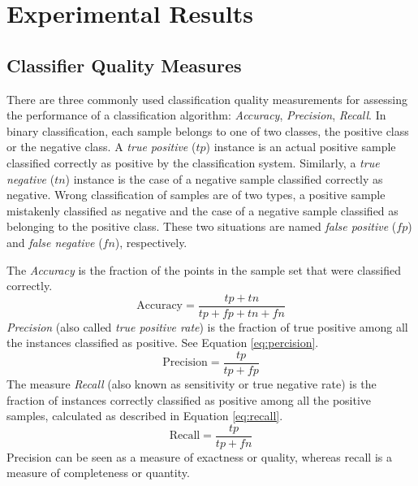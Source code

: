 \section{Experimental Results}
\label{sec:classification_results}

\subsection{Classifier Quality Measures}
\iftoggle{edit-mode}{\hspace{0pt}\marginpar{Classification types}}{}
There are three commonly used classification quality measurements for assessing the performance of a classification algorithm: \emph{Accuracy}, \emph{Precision}, \emph{Recall}.
In binary classification, each sample belongs to one of two classes, the positive class or the negative class.
A \emph{true positive} ($tp$) instance is an actual positive sample classified correctly as positive by the classification system.
Similarly, a \emph{true negative} ($tn$) instance is the case of a negative sample classified correctly as negative.  
Wrong classification of samples are of two types, a positive sample mistakenly classified as negative and the case of a negative sample classified as belonging to the positive class. 
These two situations are named \emph{false positive} ($fp$) and \emph{false negative} ($fn$), respectively.

\iftoggle{edit-mode}{\hspace{0pt}\marginpar{Classification quality measurements - binary}}{}
The \emph{Accuracy} is the fraction of the points in the sample set that were classified correctly. 
\begin{equation}
\text{Accuracy}=\frac{tp+tn}{tp+fp+tn+fn}
\label{eq:accuracy}
\end{equation}
\emph{Precision} (also called \emph{true positive rate}) is the fraction of true positive among all the instances classified as positive. 
See Equation \ref{eq:percision}.
\begin{equation}
\text{Precision}=\frac{tp}{tp+fp}
\label{eq:percision}
\end{equation}
The measure \emph{Recall} (also known as sensitivity or true negative rate) is the fraction of instances correctly classified as positive among all the positive samples, calculated as described in Equation \ref{eq:recall}.
\begin{equation}
\text{Recall}=\frac{tp}{tp+fn}  
\label{eq:recall}
\end{equation}
Precision can be seen as a measure of exactness or quality, whereas recall is a measure of completeness or quantity.


